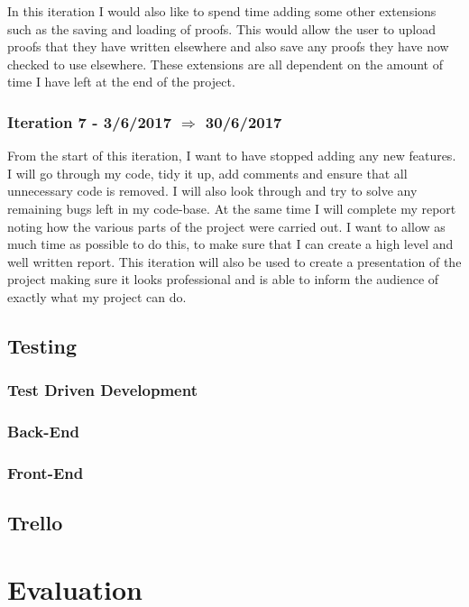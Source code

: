 In this iteration I would also like to spend time adding some other extensions such as the saving and loading of proofs. This would allow the user to upload proofs that they have written elsewhere and also save any proofs they have now checked to use elsewhere. These extensions are all dependent on the amount of time I have left at the end of the project.

\subsubsection{Iteration 7 - 3/6/2017 $\Rightarrow$ 30/6/2017}

From the start of this iteration, I want to have stopped adding any new features. I will go through my code, tidy it up, add comments and ensure that all unnecessary code is removed. I will also look through and try to solve any remaining bugs left in my code-base. At the same time I will complete my report noting how the various parts of the project were carried out. I want to allow as much time as possible to do this, to make sure that I can create a high level and well written report. This iteration will also be used to create a presentation of the project making sure it looks professional and is able to inform the audience of exactly what my project can do.

\subsection{Testing}

\subsubsection{Test Driven Development} \label{TDD}

\subsubsection{Back-End}

\subsubsection{Front-End}

\subsection{Trello}

\section{Evaluation}

